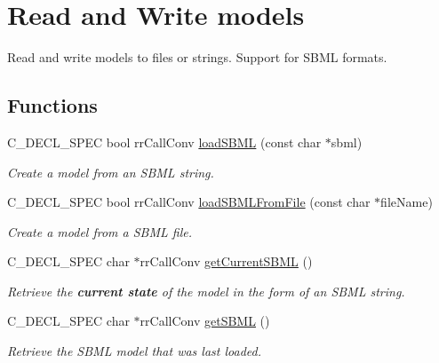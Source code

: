 \hypertarget{group__loadsave}{
\section{\-Read and \-Write models}
\label{group__loadsave}
}


\-Read and write models to files or strings. \-Support for \-S\-B\-M\-L formats.  


\subsection*{\-Functions}
\begin{DoxyCompactItemize}
\item 
\-C\-\_\-\-D\-E\-C\-L\-\_\-\-S\-P\-E\-C bool rr\-Call\-Conv \hyperlink{group__loadsave_ga4105f02dfdb959175f30cecebfb1c081}{load\-S\-B\-M\-L} (const char $\ast$sbml)
\begin{DoxyCompactList}\small\item\em \-Create a model from an \-S\-B\-M\-L string. \end{DoxyCompactList}\item 
\-C\-\_\-\-D\-E\-C\-L\-\_\-\-S\-P\-E\-C bool rr\-Call\-Conv \hyperlink{group__loadsave_gae4aa1daa0773e256698353861e3d1ef3}{load\-S\-B\-M\-L\-From\-File} (const char $\ast$file\-Name)
\begin{DoxyCompactList}\small\item\em \-Create a model from a \-S\-B\-M\-L file. \end{DoxyCompactList}\item 
\-C\-\_\-\-D\-E\-C\-L\-\_\-\-S\-P\-E\-C char $\ast$rr\-Call\-Conv \hyperlink{group__loadsave_gade5df220f410e86123128a2b617b6ec5}{get\-Current\-S\-B\-M\-L} ()
\begin{DoxyCompactList}\small\item\em \-Retrieve the {\bfseries current state} of the model in the form of an \-S\-B\-M\-L string. \end{DoxyCompactList}\item 
\-C\-\_\-\-D\-E\-C\-L\-\_\-\-S\-P\-E\-C char $\ast$rr\-Call\-Conv \hyperlink{group__loadsave_ga05a79ded419b52fa2965fce1700c0e82}{get\-S\-B\-M\-L} ()
\begin{DoxyCompactList}\small\item\em \-Retrieve the \-S\-B\-M\-L model that was last loaded. \end{DoxyCompactList}\end{DoxyCompactItemize}


